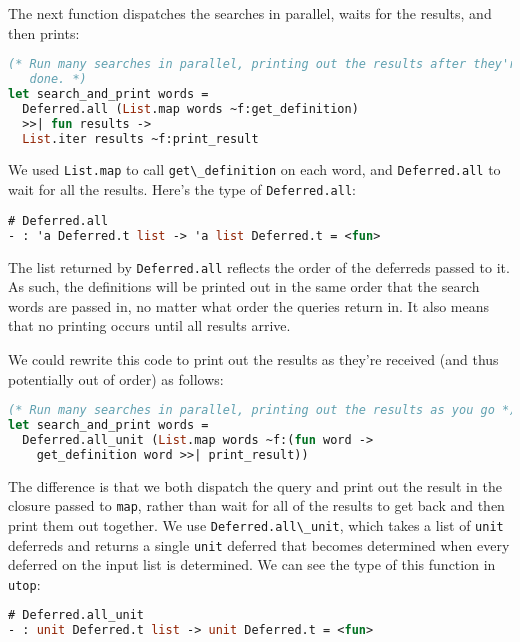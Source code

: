 The next function dispatches the searches in parallel, waits for the
results, and then prints:

\begin{lstlisting}[language=Caml]
(* Run many searches in parallel, printing out the results after they're all
   done. *)
let search_and_print words =
  Deferred.all (List.map words ~f:get_definition)
  >>| fun results ->
  List.iter results ~f:print_result
\end{lstlisting}

We used \passthrough{\lstinline!List.map!} to call
\passthrough{\lstinline!get\_definition!} on each word, and
\passthrough{\lstinline!Deferred.all!} to wait for all the results.
Here's the type of \passthrough{\lstinline!Deferred.all!}:

\begin{lstlisting}[language=Caml]
# Deferred.all
- : 'a Deferred.t list -> 'a list Deferred.t = <fun>
\end{lstlisting}

The list returned by \passthrough{\lstinline!Deferred.all!} reflects the
order of the deferreds passed to it. As such, the definitions will be
printed out in the same order that the search words are passed in, no
matter what order the queries return in. It also means that no printing
occurs until all results arrive.

We could rewrite this code to print out the results as they're received
(and thus potentially out of order) as follows:

\begin{lstlisting}[language=Caml]
(* Run many searches in parallel, printing out the results as you go *)
let search_and_print words =
  Deferred.all_unit (List.map words ~f:(fun word ->
    get_definition word >>| print_result))
\end{lstlisting}

The difference is that we both dispatch the query and print out the
result in the closure passed to \passthrough{\lstinline!map!}, rather
than wait for all of the results to get back and then print them out
together. We use \passthrough{\lstinline!Deferred.all\_unit!}, which
takes a list of \passthrough{\lstinline!unit!} deferreds and returns a
single \passthrough{\lstinline!unit!} deferred that becomes determined
when every deferred on the input list is determined. We can see the type
of this function in \passthrough{\lstinline!utop!}:

\begin{lstlisting}[language=Caml]
# Deferred.all_unit
- : unit Deferred.t list -> unit Deferred.t = <fun>
\end{lstlisting}

